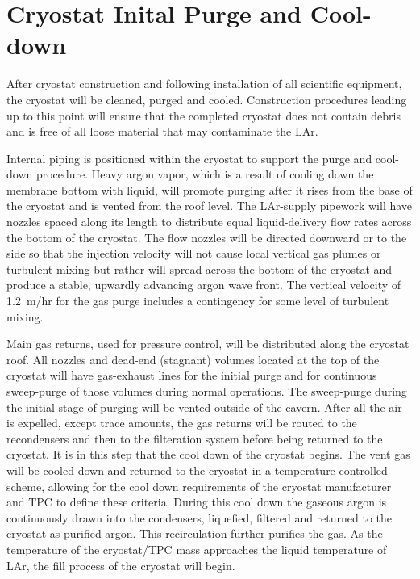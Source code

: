 \section{Cryostat Inital Purge and Cool-down}

After cryostat construction and following installation of all 
scientific equipment, the cryostat will be cleaned, purged and 
cooled. Construction procedures leading up to this point will
ensure that the completed cryostat does not contain debris and is free
of all loose material that may contaminate the LAr.

Internal piping is positioned within the cryostat to support the purge and cool-down procedure.
Heavy argon vapor, which is a result of cooling down the membrane bottom with liquid, will
promote purging after it rises from the base of the cryostat and is vented from the roof
level.  The LAr-supply pipework will have nozzles spaced along its length to distribute
equal liquid-delivery flow rates across the bottom of the cryostat.  The flow nozzles
will be directed downward or to the side so that the injection velocity will not cause
local vertical gas plumes or turbulent mixing but rather will spread across the bottom
of the cryostat and produce a stable, upwardly advancing argon wave front. The vertical
velocity of 1.2~m/hr for the gas purge includes a contingency for some level of
turbulent mixing. 

Main gas returns, used for pressure control, will be distributed along the cryostat roof.
All nozzles and dead-end (stagnant) volumes located at the top of the cryostat will
have gas-exhaust lines for the initial purge and for continuous sweep-purge of
those volumes during normal operations.  
The sweep-purge during the initial stage of purging will be vented outside of the cavern.
After all the air is expelled, except trace amounts, the gas returns will be routed
to the recondensers and then to the filteration system before being returned to the cryostat.
It is in this step that the cool down of the cryostat begins. The vent gas will be cooled
down and returned to the cryostat in a temperature controlled scheme, allowing for
the cool down requirements of the cryostat manufacturer and TPC to define these
criteria. During this cool down the gaseous argon is continuously drawn into the
condensers, liquefied, filtered and returned to the cryostat as purified argon.
This recirculation further purifies the gas. As the temperature of the cryostat/TPC
mass approaches the liquid temperature of LAr, the fill process of the cryostat
will begin.

